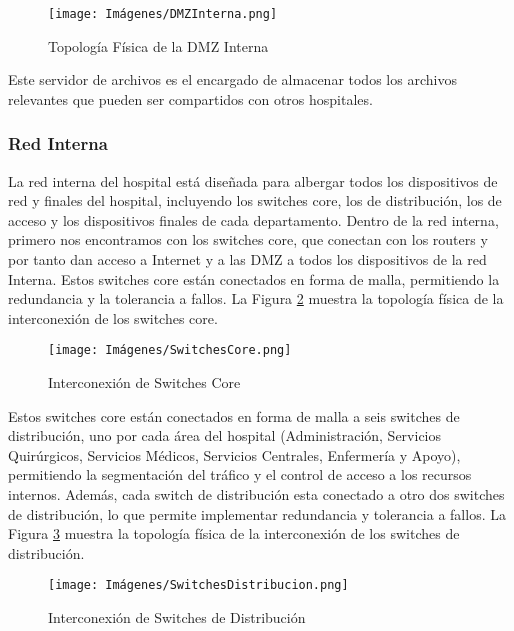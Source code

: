 \begin{figure}[H]
    \centering
    \texttt{[image: Imágenes/DMZInterna.png]}
    \caption{Topología Física de la DMZ Interna}
    \label{fig:DMZInterna}
\end{figure}

Este servidor de archivos es el encargado de almacenar todos los archivos relevantes que pueden ser compartidos con otros hospitales.

\subsubsection{Red Interna}
La red interna del hospital está diseñada para albergar todos los dispositivos de red y finales del hospital, incluyendo los switches core, los de distribución, los de acceso y los dispositivos finales 
de cada departamento. Dentro de la red interna, primero nos encontramos con los switches core, que conectan con los routers y por tanto dan acceso a Internet y a las DMZ a todos los dispositivos de la red Interna.
Estos switches core están conectados en forma de malla, permitiendo la redundancia y la tolerancia a fallos. La Figura \ref{fig:SwitchesCore} muestra la topología física de la interconexión de los switches core.

\begin{figure}[H]
    \centering
    \texttt{[image: Imágenes/SwitchesCore.png]}
    \caption{Interconexión de Switches Core}
    \label{fig:SwitchesCore}
\end{figure}

Estos switches core están conectados en forma de malla a seis switches de distribución, uno por cada área del hospital (Administración, Servicios Quirúrgicos, Servicios Médicos, Servicios Centrales, Enfermería y Apoyo), 
permitiendo la segmentación del tráfico y el control de acceso a los recursos internos. Además, cada switch de distribución esta conectado a otro dos switches de distribución, 
lo que permite implementar redundancia y tolerancia a fallos. La Figura \ref{fig:SwitchesDistribucion} muestra la topología física de la interconexión de los switches de distribución.

\begin{figure}[H]
    \centering
    \texttt{[image: Imágenes/SwitchesDistribucion.png]}
    \caption{Interconexión de Switches de Distribución}
    \label{fig:SwitchesDistribucion}
\end{figure}

